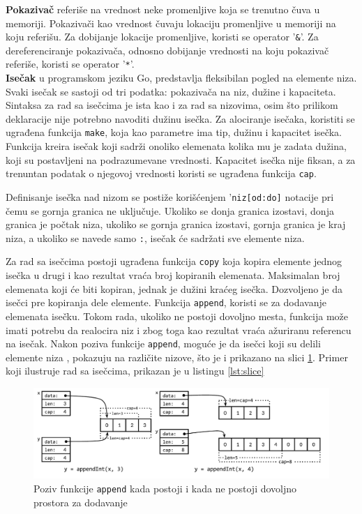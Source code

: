 \documentclass[12pt,oneside]{memoir}
\begin{document}
\textbf{Pokazivač} referiše na vrednost neke promenljive koja se trenutno čuva u memoriji. Pokazivači kao vrednost čuvaju lokaciju promenljive u memoriji na koju referišu. Za dobijanje lokacije promenljive, koristi se operator '\texttt{\&}'. Za dereferenciranje pokazivača, odnosno dobijanje vrednosti na koju pokazivač referiše, koristi se operator '\texttt{*}'.
\\

\textbf{Isečak} u programskom jeziku Go, predstavlja fleksibilan pogled na elemente niza. Svaki isečak se sastoji od tri podatka: pokazivača na niz, dužine i kapaciteta. Sintaksa za rad sa isečcima je ista kao i za rad sa nizovima, osim što prilikom deklaracije nije potrebno navoditi dužinu isečka. Za alociranje isečaka, koristiti se ugrađena funkcija \texttt{make}, koja kao parametre ima tip, dužinu i kapacitet isečka. Funkcija kreira isečak koji sadrži onoliko elemenata kolika mu je zadata dužina, koji su postavljeni na podrazumevane vrednosti. Kapacitet isečka nije fiksan, a za trenuntan podatak o njegovoj vrednosti koristi se ugrađena funkcija \texttt{cap}.

Definisanje isečka nad nizom se postiže korišćenjem '\texttt{niz[od:do]} notacije pri čemu se gornja granica ne uključuje. Ukoliko se donja granica izostavi, donja granica je počtak niza, ukoliko se gornja granica izostavi, gornja granica je kraj niza, a ukoliko se navede samo \texttt{:}, isečak će sadržati sve elemente niza. 

Za rad sa isečcima postoji ugrađena funkcija \texttt{copy} koja kopira elemente jednog isečka u drugi i kao rezultat vraća broj kopiranih elemenata. Maksimalan broj elemenata koji će biti kopiran, jednak je dužini kraćeg isečka. Dozvoljeno je da isečci pre kopiranja dele elemente. Funkcija \texttt{append}, koristi se za dodavanje elemenata isečku. Tokom rada, ukoliko ne postoji dovoljno mesta, funkcija može imati potrebu da realocira niz i zbog toga kao rezultat vraća ažuriranu referencu na isečak. Nakon poziva funkcije \texttt{append}, moguće je da isečci koji su delili elemente niza \cite{bookGoProg}, pokazuju na različite nizove, što je i prikazano na slici \ref{fig:slice}. Primer koji ilustruje rad sa isečcima, prikazan je u listingu \ref{lst:slice}

\begin{figure}
\begin{center}
\includegraphics[scale=0.37]{slice.png}
\end{center}
\caption{Poziv funkcije \texttt{append} kada postoji i kada ne postoji dovoljno prostora za dodavanje}
\label{fig:slice}
\end{figure}
\end{document}

